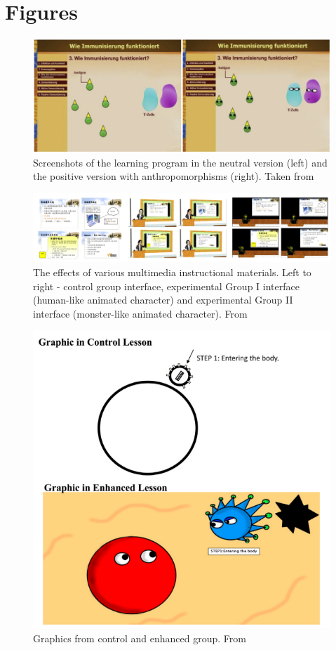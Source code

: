 \section{Figures}

\begin{figure}[h!]
	\centering
	\includegraphics[width=1\linewidth]{graphics/anthropomorphisms}
	\caption{Screenshots of the learning program in the neutral version (left) and the positive version with anthropomorphisms (right). Taken from \cite{Park2015}}
	\label{fig:anthropomorphisms}
\end{figure}

\begin{figure}
	\centering
	\includegraphics[width=1\linewidth]{graphics/The_effects_of_multimedia_instructional_materials}
	\caption{The effects of various multimedia instructional materials. Left to right - control group interface, experimental Group I interface (human-like animated character) and experimental Group II interface (monster-like animated character). From \cite{Lee2014}}
	\label{fig:theeffectsofmultimediainstructionalmaterials}
\end{figure}

\begin{figure}
	\centering
	\includegraphics[width=0.7\linewidth]{graphics/Benefits_of_emotional_design_in_multimedia_instruction}
	\caption{Graphics from control and enhanced group. From \cite{Mayer2014}}
	\label{fig:benefits-bio-lesson}
\end{figure}	